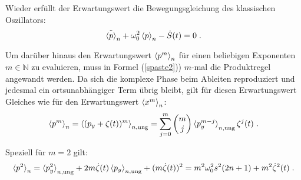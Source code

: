     Wieder erfüllt der Erwartungswert die Bewegungsgleichung des klassischen Oszillators:
    \begin{equation}
      \ddot{\braket{p}}_n + \omega_0^2\braket{p}_n - \dot{S}(t) = 0 \; .
    \end{equation}
\iffalse
    Wie an (\ref{spaste2}) zu sehen, ist es darüber hinaus einfach den Erwartungswert $\braket{p^m}_n$ für einen beliebigen Exponenten $m \in \mathbb{N}$ zu evaluieren.
    Wir können auf dem gleichen Weg die Produktregel anwenden, und erhalten wieder den ungetrieben Erwartungswert $\braket{p^m_y}_n$ aber diesmal zusätzlich die $m$-fache Anwendung des Operators auf die komplexe Phase, was wir sofort verallgemeinert aufschreiben können, da sich die komplexe Phase beim Ableiten nur reproduziert, weil immer der ortsunabhängige Term $m\dot{\zeta(t)}$ übrig bleibt.
    Es folgt:
    \begin{equation}
      \braket{p^m}_n = \braket{p^m_y}_{n,\text{ung}} + (m\dot{\zeta}(t))^m \; .
    \end{equation}
    Speziell für $m=2$ gilt:
    \begin{equation}
      \braket{p^2}_n = \braket{p^2_y}_{n,\text{ung}} + (m\dot{\zeta}(t))^2 = m^2\omega^2_0 s^2(2n+1) + m^2\dot{\zeta}^2(t) \; .
      \label{erwartungswert_p^2_einzelner}
    \end{equation}
\fi
    Um darüber hinaus den Erwartungswert $\braket{p^m}_n$ für einen beliebigen Exponenten $m \in \mathbb{N}$ zu evaluieren, muss in Formel (\ref{spaste2})) $m$-mal die Produktregel angewandt werden.
    Da sich die komplexe Phase beim Ableiten reproduziert und jedesmal ein ortsunabhängiger Term übrig bleibt, gilt für diesen Erwartungswert Gleiches wie für den Erwartungswert $\braket{x^m}_n$:
    \begin{equation}
        \braket{p^m}_n = \braket{(p_y+\zeta(t))^m}_{n,\text{ung}} = \sum_{j=0}^m\begin{pmatrix} m \\ j \\ \end{pmatrix} \braket{p_y^{m-j}}_{n,\text{ung}}\zeta^j(t) \; .
    \end{equation}

    Speziell für $m=2$ gilt:
    \begin{equation}
      \braket{p^2}_n = \braket{p^2_y}_{n,\text{ung}} +2m\dot\zeta(t)\braket{p_y}_{n,\text{ung}}+(m\dot{\zeta}(t))^2 = m^2\omega^2_0 s^2(2n+1) + m^2\dot{\zeta}^2(t) \; .
      \label{erwartungswert_p^2_einzelner}
    \end{equation}



